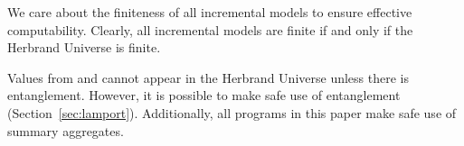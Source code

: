 We care about the finiteness of all incremental models to ensure effective
computability.  Clearly, all incremental models are finite if and only if the
Herbrand Universe is finite.

Values from  and  cannot appear in the
Herbrand Universe unless there is entanglement.  However, it is possible to
make safe use of entanglement (Section~\ref{sec:lamport}).  Additionally, all
programs in this paper make safe use of summary aggregates.



